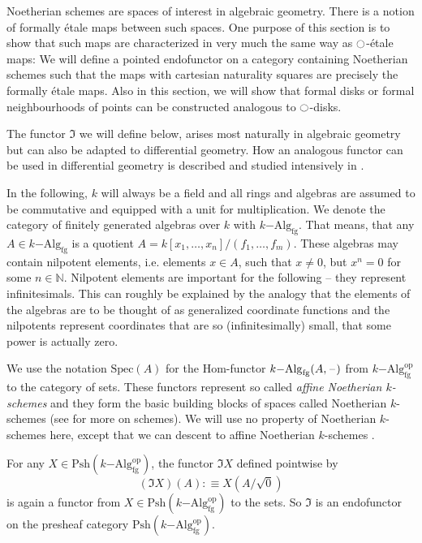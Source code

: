 \documentclass[9pt,twosided]{amsart}
\newcommand{\bN}{\mathbb N}
\newcommand{\Spec}{\ensuremath{\mathrm{Spec}}}
\begin{document}
Noetherian schemes are spaces of interest in algebraic geometry. There is a notion of formally étale maps between such spaces.
One purpose of this section is to show that such maps are characterized in very much the same way as ${\ocircle}$-étale maps:
We will define a pointed endofunctor on a category containing Noetherian schemes
such that the maps with cartesian naturality squares are precisely the formally étale maps.
Also in this section, we will show that formal disks or formal neighbourhoods of points can be constructed analogous to ${\ocircle}$-disks.

The functor $\Im$ we will define below, arises most naturally in algebraic geometry but can also be adapted to differential geometry.
How an analogous functor can be used in differential geometry is described and studied intensively in \cite{SyntheticPDEs}.

In the following, $k$ will always be a field and all rings and algebras are assumed to be commutative and equipped with a unit for multiplication.
We denote the category of finitely generated algebras over $k$ with $k\mathrm{-Alg}_{\mathrm{fg}}$.
That means, that any $A\in k\mathrm{-Alg}_{\mathrm{fg}}$ is a quotient $A=k[x_1,\dots,x_n]/(f_1,\dots,f_m)$.
These algebras may contain nilpotent elements, i.e. elements $x\in A$, such that $x\neq 0$, but $x^n=0$ for some $n\in\bN$.
Nilpotent elements are important for the following -- they represent infinitesimals.
This can roughly be explained by the analogy
that the elements of the algebras are to be thought of as generalized coordinate functions
and the nilpotents represent coordinates that are so (infinitesimally) small, that some power is actually zero. 

We use the notation $\Spec(A)$ for the Hom-functor $k\mathrm{-Alg}_{\mathrm{fg}}(A,\mathord{\hspace{1pt}\text{--}\hspace{1pt}})$ from $k\mathrm{-Alg}^{\mathrm{op}}_{\mathrm{fg}}$ to the category of sets.
These functors represent so called \emph{affine Noetherian $k$-schemes} and they form the basic building blocks of spaces called Noetherian $k$-schemes
(see \cite[Chapter II]{hartshorne} for more on schemes).
We will use no property of Noetherian $k$-schemes here,
except that we can descent to affine Noetherian $k$-schemes .

For any $X\in\mathrm{Psh}(k\mathrm{-Alg}^\mathrm{op}_{\mathrm{fg}})$,
the functor $\Im X$ defined pointwise by
\[ (\Im X)(A):\equiv X(A/\sqrt{0})\]
is again a functor from $X\in\mathrm{Psh}(k\mathrm{-Alg}^\mathrm{op}_{\mathrm{fg}})$ to the sets.
So $\Im$ is an endofunctor on the presheaf category $\mathrm{Psh}(k\mathrm{-Alg}^\mathrm{op}_{\mathrm{fg}})$.
\end{document}
